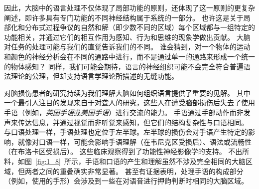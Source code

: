 因此，大脑中的语言处理不仅体现了局部功能的原则，还体现了这一原则的更复杂阐述，即许多具有专门功能的不同神经结构属于系统的一部分。
也许这是关于局部化和分布式过程争议的自然和解（即少数不同的区域）每个区域都与一组特定的功能相关，并通过它们的相互作用为感知、行为和思维的现象学做出贡献。
大脑对任务的处理可能与我们的直觉告诉我们的不同。
谁会猜到，对一个物体的运动和颜色的神经分析会在不同的通路中进行，而不是通过单一的通路来形成一个统一的物体感知？
同样，我们可能会期待，语言的神经组织可能不会完全符合普遍语法理论的公理，但却支持语言学理论所描述的无缝功能。




对脑损伤患者的研究持续为我们理解大脑如何组织语言提供了重要的见解。
其中一个最引人注目的发现来自于对聋人的研究，这些人在遭受脑部损伤后失去了使用手语（例如，\textit{英国手语}或\textit{美国手语}）进行交流的能力。
手语通过手部动作而非发声来传达信息，并通过视觉而非听觉来感知，但它们的结构复杂性与口语相同。
与口语处理一样，手语处理也定位于左半球。左半球的损伤会对手语产生特定的影响，就像对口语一样，可能会影响手语理解（在韦尼克区受损后）、语法或流畅性（在布洛卡区受损后）。
这些临床观察得到了功能性神经影像学的支持。
不出所料，如图~\ref{fig:1_8}~所示，手语和口语的产生和理解虽然不涉及完全相同的大脑区域，但两者之间的重叠确实非常显著。
甚至有证据表明，处理手语的构成部分（例如，使用的手形）会涉及到一些在对语音进行押韵判断时相同的大脑区域。



